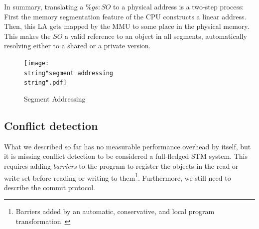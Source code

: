 \documentclass{sigplanconf}
\begin{document}
In summary, translating a $\%gs:SO$ to a physical address is a
two-step process: First the memory segmentation feature of the CPU
constructs a linear address. Then, this LA gets mapped by the MMU to
some place in the physical memory. This makes the $SO$ a valid reference
to an object in all segments, automatically resolving either to a
shared or a private version.



\begin{figure}[t]
  \centering
  \texttt{[image: \\string"segment addressing\\string".pdf]}
  \caption{Segment Addressing\label{fig:Segment-Addressing}}
\end{figure}


\subsection{Conflict detection}

What we described so far has no measurable performance overhead by
itself, but it is missing conflict detection to be considered a
full-fledged STM system.  This requires adding \emph{barriers} to the
program to register the objects in the read or write set before
reading or writing to them\footnote{Barriers added by an automatic, conservative, and
local program transformation~\cite{felber07}}.  Furthermore, we still
need to describe the commit protocol.
\end{document}
